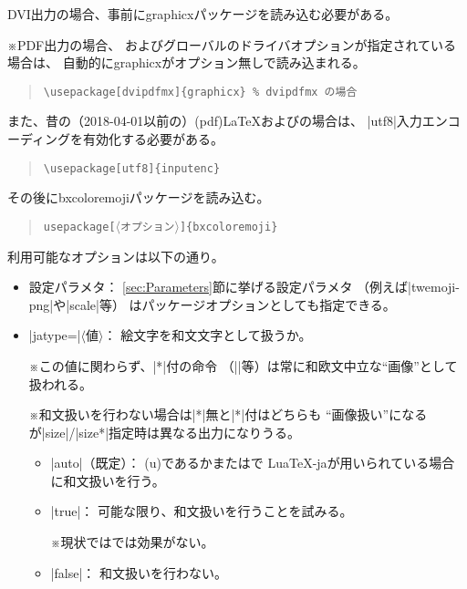\documentclass[a4paper]{ltjsarticle}
\renewcommand{\headfont}{\romanseries{sbc}\sffamily}
\newcommand{\Pkg}[1]{\textsf{#1}}
\newcommand{\Meta}[1]{$\langle$\mbox{}#1\mbox{}$\rangle$}
\newcommand{\RMeta}[1]{{\Meta{\rmfamily#1}}}
\newcommand{\Note}{\par\noindent ※}
\newcommand{\Means}{：\quad}
\newcommand{\／}{\mbox{}／\mbox{}}
\newcommand{\cs}[1]{\symbol{`\\}#1}
\providecommand{\Strong}[1]{{\headfont#1}}
\begin{document}
DVI出力の場合、事前に\Pkg{graphicx}パッケージを読み込む必要がある。

※PDF出力の場合、
およびグローバルのドライバオプションが指定されている場合は、
自動的に\Pkg{graphicx}がオプション無しで読み込まれる。

\begin{quote}\small\begin{verbatim}
\usepackage[dvipdfmx]{graphicx} % dvipdfmx の場合
\end{verbatim}\end{quote}

また、昔の（2018-04-01以前の）(pdf){\LaTeX}および{\pLaTeX}の場合は、
|utf8|入力エンコーディングを有効化する必要がある。

\begin{quote}\small\begin{verbatim}
\usepackage[utf8]{inputenc}
\end{verbatim}\end{quote}

その後に\Pkg{bxcoloremoji}パッケージを読み込む。

\begin{quote}\small\begin{alltt}
\cs{usepackage}[\RMeta{オプション}]\{bxcoloremoji\}
\end{alltt}\end{quote}

利用可能なオプションは以下の通り。

\begin{itemize}
\item \Strong{設定パラメタ}\Means
  \ref{sec:Parameters}節に挙げる設定パラメタ
  （例えば|twemoji-png|や|scale|等）
  はパッケージオプションとしても指定できる。

\item |jatype=|\Meta{値}\Means
  絵文字を和文文字として扱うか。
  \Note この値に関わらず、|*|付の命令
  （||等）は常に和欧文中立な“画像”として扱われる。
  \Note 和文扱いを行わない場合は|*|無と|*|付はどちらも
  “画像扱い”になるが|size|/|size*|指定時は異なる出力になりうる。
  \begin{itemize}
  \item |auto|（既定）\Means
    (u){\pLaTeX}であるかまたは{\LuaLaTeX}で
    \Pkg{LuaTeX-ja}が用いられている場合に和文扱いを行う。
  \item |true|\Means
    可能な限り、和文扱いを行うことを試みる。
    \Note 現状では{\pdfLaTeX}では効果がない。
  \item |false|\Means
    和文扱いを行わない。
  \end{itemize}
\end{itemize}
\end{document}
